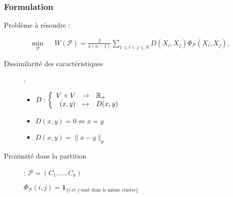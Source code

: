 \documentclass[c]{beamer}
\begin{document}
\begin{frame}
    \frametitle{Formulation}
    Problème à r\'esoudre :

    \[
        \begin{aligned}
            & \min_{\mathcal{P}}
            && W\left(\mathcal{P} \right)
            = \frac{2}{n(n-1)} \sum_{1 \leq i < j \leq N} D(X_i, X_j) \Phi_{\mathcal{P}}(X_i, X_j),
        \end{aligned}
    \]

    \begin{description}
        \item[Dissimilarit\'e des caract\'eristiques] :

            \begin{itemize}
                \item
                    $D:\left\{
                    \begin{array}{r c l}
                        V \times V & \rightarrow & \mathbb{R}_+ \\
                        (x, y) & \mapsto & D(x, y)
                    \end{array}
                    \right.$
                \item $D(x, y) = 0 \iff x = y$
                \item $D(x, y) = \|x - y\|_p$
            \end{itemize}
        \item[Proximit\'e dans la partition] :
            $\mathcal{P} = \left( C_1, \ldots, C_k \right)$

            $\Phi_{\mathcal{P}}(i, j) = \mathbf{1}_{\{i \text{ et } j \text{ sont dans le même
            cluster}\}}$

    \end{description}
\end{frame}
\end{document}
